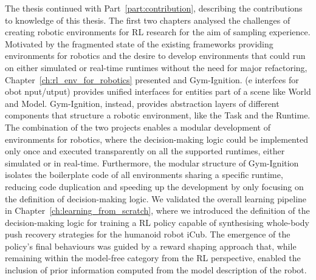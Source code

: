 The thesis continued with Part~\ref{part:contribution}, describing the contributions to knowledge of this thesis.
The first two chapters analysed the challenges of creating robotic environments for \ac{RL} research for the aim of sampling experience.
Motivated by the fragmented state of the existing frameworks providing environments for robotics and the desire to develop environments that could run on either simulated or real-time runtimes without the need for major refactoring, Chapter~\ref{ch:rl_env_for_robotics} presented \scenario and Gym-Ignition.
\scenario (e interfces for obot nput/utput) provides unified interfaces for entities part of a scene like World and Model.
Gym-Ignition, instead, provides abstraction layers of different components that structure a robotic environment, like the Task and the Runtime.
The combination of the two projects enables a modular development of environments for robotics, where the decision-making logic could be implemented only once and executed transparently on all the supported runtimes, either simulated or in real-time.
Furthermore, the modular structure of Gym-Ignition isolates the boilerplate code of all environments sharing a specific runtime, reducing code duplication and speeding up the development by only focusing on the definition of decision-making logic.
We validated the overall learning pipeline in Chapter~\ref{ch:learning_from_scratch}, where we introduced the definition of the decision-making logic for training a \ac{RL} policy capable of synthesising whole-body push recovery strategies for the humanoid robot iCub.
The emergence of the policy's final behaviours was guided by a reward shaping approach that, while remaining within the model-free category from the \ac{RL} perspective, enabled the inclusion of prior information computed from the model description of the robot.

